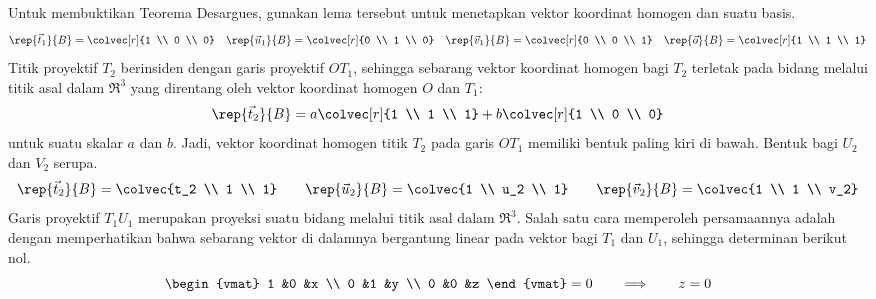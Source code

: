 Untuk membuktikan Teorema Desargues, gunakan lema tersebut untuk menetapkan
vektor koordinat homogen dan suatu basis.
\begin{equation*}
  \rep{\vec{t}_1}{B}=\colvec[r]{1 \\ 0 \\ 0}
  \quad
  \rep{\vec{u}_1}{B}=\colvec[r]{0 \\ 1 \\ 0}
  \quad
  \rep{\vec{v}_1}{B}=\colvec[r]{0 \\ 0 \\ 1}
  \quad
  \rep{\vec{o}}{B}=\colvec[r]{1 \\ 1 \\ 1}    
\end{equation*}
Titik proyektif $T_2$ berinsiden dengan garis proyektif $OT_1$, sehingga
sebarang vektor koordinat homogen bagi $T_2$ terletak pada bidang melalui titik
asal dalam $\Re^3$ yang direntang oleh vektor koordinat homogen $O$ dan $T_1$:
\begin{equation*}
  \rep{\vec{t}_2}{B}=a\colvec[r]{1 \\ 1 \\ 1}
                          +b\colvec[r]{1 \\ 0 \\ 0}
\end{equation*}
untuk suatu skalar $a$ dan $b$.
Jadi, vektor koordinat homogen titik $T_2$ pada garis $OT_1$ memiliki bentuk
paling kiri di bawah.
Bentuk bagi $U_2$ dan $V_2$ serupa.
\begin{equation*}
  \rep{\vec{t}_2}{B}=\colvec{t_2 \\ 1 \\ 1}
  \qquad
  \rep{\vec{u}_2}{B}=\colvec{1 \\ u_2 \\ 1}
  \qquad
  \rep{\vec{v}_2}{B}=\colvec{1 \\ 1 \\ v_2}
\end{equation*}
Garis proyektif $T_1U_1$ merupakan proyeksi suatu bidang melalui titik asal
dalam $\Re^3$.
Salah satu cara memperoleh persamaannya adalah dengan memperhatikan bahwa
sebarang vektor di dalamnya bergantung linear pada vektor bagi $T_1$ dan $U_1$,
sehingga determinan berikut nol.
\begin{equation*}
  \begin{vmat}
    1  &0  &x  \\
    0  &1  &y  \\
    0  &0  &z
  \end{vmat}=0
  \qquad
  \Longrightarrow
  \qquad
  z=0
\end{equation*}

